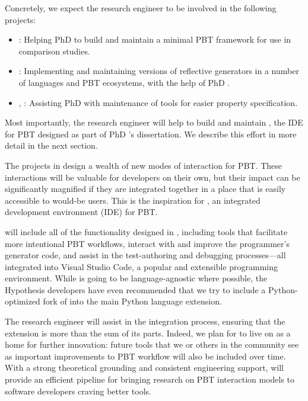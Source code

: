 Concretely, we expect the research engineer to be involved in the following
projects:
\begin{itemize}[noitemsep]
  \item {}: Helping PhD  to build and maintain a minimal PBT
  framework for use in comparison studies.
  \item {}: Implementing and maintaining versions of
  reflective generators in a number of languages and PBT ecosystems, with the
  help of PhD .
  \item {}, : Assisting PhD
   with maintenance of tools for easier property specification.
\end{itemize}
Most importantly, the research engineer will help to build and maintain
\tyche{}, the IDE for PBT designed as part of PhD 's dissertation. We
describe this effort in more detail in the next section.

The projects in  design a wealth of new modes of interaction
for PBT. These interactions will be valuable for developers on their own, but
their impact can be significantly magnified if they are integrated together in a
place that is easily accessible to would-be users. This is the inspiration for
\tyche{}, an integrated development environment (IDE) for PBT.

\tyche{} will include all of the functionality designed in ,
including tools that facilitate more intentional PBT workflows, interact with
and improve the programmer's generator code, and assist in the test-authoring
and debugging processes---all integrated into Visual Studio Code, a popular
and extensible programming environment.
While \tyche{} is going to be language-agnostic where possible, the Hypothesis
developers have even recommended that we try to include a Python-optimized fork of
\tyche{} into the main Python language extension.

The research engineer will assist in the integration process, ensuring that the
extension is more than the sum of its parts. Indeed, we plan for \tyche{} to
live on as a home for further innovation: future tools that we or others in the
community see as important improvements to PBT workflow will also be included
over time.  With a strong theoretical grounding and consistent engineering
support, \tyche{} will provide an efficient pipeline for bringing research on
PBT interaction models to software developers craving better tools.

